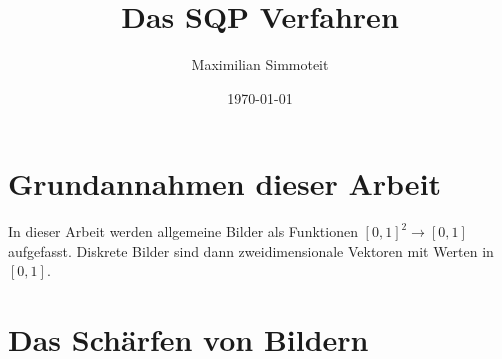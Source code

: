 \documentclass{article}
\theoremstyle{case}
\begin{document}
%
%
\title{Das SQP Verfahren}
%
\author{Maximilian Simmoteit}
%
\date{\today}
%
\maketitle





\section*{Grundannahmen dieser Arbeit}

In dieser Arbeit werden allgemeine Bilder als Funktionen $[0,1]^{2}\rightarrow [0,1]$ aufgefasst. Diskrete Bilder sind dann zweidimensionale Vektoren mit Werten in $[0,1]$. 


\section{Das Schärfen von Bildern}
\end{document}
